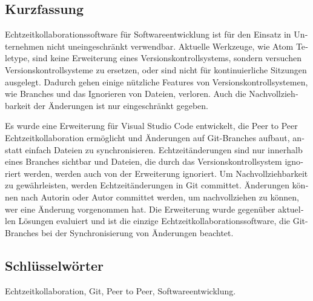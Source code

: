 
\cleardoublepage
{}




\begin{otherlanguage}{ngerman}

  \chapter*{Kurzfassung}

  Echtzeitkollaborationssoftware für Softwareentwicklung ist für den Einsatz in Unternehmen nicht uneingeschränkt verwendbar. Aktuelle Werkzeuge, wie Atom Teletype, sind keine Erweiterung eines Versionskontrollsystems, sondern versuchen Versionskontrollsysteme zu ersetzen, oder sind nicht für kontinuierliche Sitzungen ausgelegt. Dadurch gehen einige nützliche Features von Versionskontrollsystemen, wie Branches und das Ignorieren von Dateien, verloren. Auch die Nachvollziehbarkeit der Änderungen ist nur eingeschränkt gegeben.
  
  Es wurde eine Erweiterung für Visual Studio Code entwickelt, die Peer to Peer Echtzeitkollaboration ermöglicht und Änderungen auf Git-Branches aufbaut, anstatt einfach Dateien zu synchronisieren. Echtzeitänderungen sind nur innerhalb eines Branches sichtbar und Dateien, die durch das Versionskontrollsystem ignoriert werden, werden auch von der Erweiterung ignoriert. Um Nachvollziehbarkeit zu gewährleisten, werden Echtzeitänderungen in Git committet. Änderungen können nach Autorin oder Autor committet werden, um nachvollziehen zu können, wer eine Änderung vorgenommen hat. Die Erweiterung wurde gegenüber aktuellen Lösungen evaluiert und ist die einzige Echtzeitkollaborationssoftware, die Git-Branches bei der Synchronisierung von Änderungen beachtet.

	

  \bigskip

  \section*{Schl\"usselw\"orter}
  Echtzeitkollaboration, Git, Peer to Peer,  Softwareentwicklung.

\end{otherlanguage}

